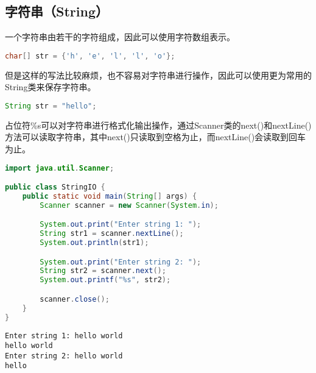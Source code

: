 \subsection{字符串（String）}

一个字符串由若干的字符组成，因此可以使用字符数组表示。

\vspace{-0.5cm}

\begin{lstlisting}[language=Java]
char[] str = {'h', 'e', 'l', 'l', 'o'};
\end{lstlisting}

但是这样的写法比较麻烦，也不容易对字符串进行操作，因此可以使用更为常用的String类来保存字符串。

\vspace{-0.5cm}

\begin{lstlisting}[language=Java]
String str = "hello";
\end{lstlisting}

占位符\%s可以对字符串进行格式化输出操作，通过Scanner类的next()和nextLine()方法可以读取字符串，其中next()只读取到空格为止，而nextLine()会读取到回车为止。\\


\begin{lstlisting}[language=Java]
import java.util.Scanner;

public class StringIO {
	public static void main(String[] args) {
		Scanner scanner = new Scanner(System.in);

		System.out.print("Enter string 1: ");
		String str1 = scanner.nextLine();
		System.out.println(str1);

		System.out.print("Enter string 2: ");
		String str2 = scanner.next();
		System.out.printf("%s", str2);

		scanner.close();
	}
}
\end{lstlisting}

\begin{tcolorbox}
	\begin{verbatim}
Enter string 1: hello world
hello world
Enter string 2: hello world
hello
	\end{verbatim}
\end{tcolorbox}

\vspace{0.5cm}


